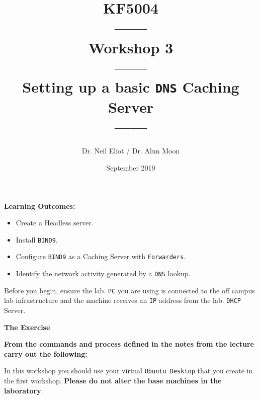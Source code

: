 \documentclass[11pt]{article}
\begin{document}
\author{Dr. Neil Eliot / Dr. Alun Moon}
\title{KF5004\\------\\Workshop 3\\------\\Setting up a basic \texttt{DNS} Caching Server\\------}
\date{September 2019}
\maketitle

\newpage



\noindent\textbf{Learning Outcomes:}
\begin{itemize}
    \item Create a Headless server.
    \item Install \texttt{BIND9}.
    \item Configure \texttt{BIND9} as a Caching Server with \texttt{Forwarders}.
    \item Identify the network activity generated by a \texttt{DNS} lookup.
\end{itemize}


\begin{tcolorbox}[title={\textbf{Important:}}]
    Before you begin, ensure the lab. \texttt{PC} you are using is connected to the off campus lab infrastructure and the machine receives an \texttt{IP} address from the lab. \texttt{DHCP} Server.
\end{tcolorbox}
\newpage

\noindent\textbf{The Exercise}\\
\begin{tcolorbox}[colback=blue!20]
    \noindent\textbf{From the commands and process defined in the notes from the lecture carry out the following:}
\end{tcolorbox}


\begin{tcolorbox}[title={\textbf{NOTE:}}]
    In this workshop you should use your virtual \texttt{Ubuntu Desktop} that you create in the first workshop. \textbf{Please do not alter the base machines in the laboratory}.
\end{tcolorbox}
\end{document}
